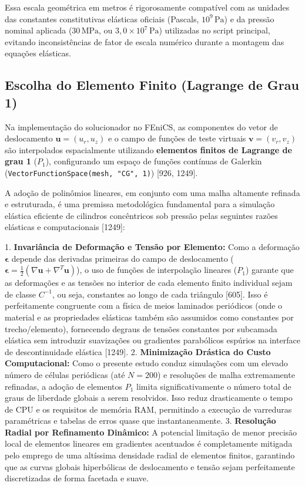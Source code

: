 Essa escala geométrica em metros é rigorosamente compatível com as unidades das constantes constitutivas elásticas oficiais (Pascals, $10^9 \, \text{Pa}$) e da pressão nominal aplicada ($30 \, \text{MPa}$, ou $3,0 \times 10^7 \, \text{Pa}$) utilizadas no script principal, evitando inconsistências de fator de escala numérico durante a montagem das equações elásticas.

\subsection{Escolha do Elemento Finito (Lagrange de Grau 1)}

Na implementação do solucionador no FEniCS, as componentes do vetor de deslocamento $\mathbf{u} = (u_r, u_z)$ e o campo de funções de teste virtuais $\mathbf{v} = (v_r, v_z)$ são interpolados espacialmente utilizando \textbf{elementos finitos de Lagrange de grau 1} ($P_1$), configurando um espaço de funções contínuas de Galerkin (\texttt{VectorFunctionSpace(mesh, "CG", 1)}) [926, 1249].

A adoção de polinômios lineares, em conjunto com uma malha altamente refinada e estruturada, é uma premissa metodológica fundamental para a simulação elástica eficiente de cilindros concêntricos sob pressão pelas seguintes razões elásticas e computacionais [1249]:

1. \textbf{Invariância de Deformação e Tensão por Elemento:} Como a deformação $\mathbf{\epsilon}$ depende das derivadas primeiras do campo de deslocamento ($\mathbf{\epsilon} = \frac{1}{2}(\nabla \mathbf{u} + \nabla^T \mathbf{u})$), o uso de funções de interpolação lineares ($P_1$) garante que as deformações e as tensões no interior de cada elemento finito individual sejam de classe $C^{-1}$, ou seja, constantes ao longo de cada triângulo [605]. Isso é perfeitamente congruente com a física de meios laminados periódicos (onde o material e as propriedades elásticas também são assumidos como constantes por trecho/elemento), fornecendo degraus de tensões constantes por subcamada elástica sem introduzir suavizações ou gradientes parabólicos espúrios na interface de descontinuidade elástica [1249].
2. \textbf{Minimização Drástica do Custo Computacional:} Como o presente estudo conduz simulações com um elevado número de células periódicas (até $N = 200$) e resoluções de malha extremamente refinadas, a adoção de elementos $P_1$ limita significativamente o número total de graus de liberdade globais a serem resolvidos. Isso reduz drasticamente o tempo de CPU e os requisitos de memória RAM, permitindo a execução de varreduras paramétricas e tabelas de erros quase que instantaneamente.
3. \textbf{Resolução Radial por Refinamento Dinâmico:} A potencial limitação de menor precisão local de elementos lineares em gradientes acentuados é completamente mitigada pelo emprego de uma altíssima densidade radial de elementos finitos, garantindo que as curvas globais hiperbólicas de deslocamento e tensão sejam perfeitamente discretizadas de forma facetada e suave.

